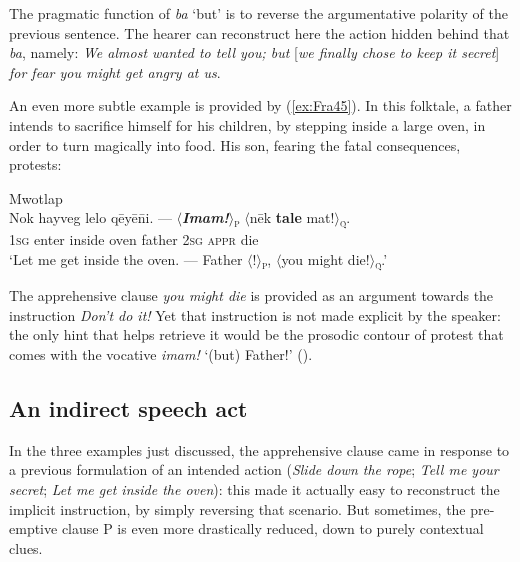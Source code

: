 \documentclass[output=paper,colorlinks,citecolor=brown]{langscibook}
\begin{document}
\noindent The pragmatic function of \textit{ba} `but' is to reverse the argumentative polarity of the previous sentence. The hearer can reconstruct here the action hidden behind that \textit{ba}, namely: \textit{We almost wanted to tell you; but} [\textit{we finally chose to keep it secret}] \textit{for fear you might get angry at us}. 

An even more subtle example is provided by (\ref{ex:Fra45}). In this folktale, a father intends to sacrifice himself for his children, by stepping inside a large oven, in order to turn magically into food. His son, fearing the fatal consequences, protests:

\ea \label{ex:Fra45} \textnormal{Mwotlap}  \\
\gll Nok hayveg lelo qēyē\={n}i. --- ${\langle}$\textbf{\textit{Imam!}}${\rangle}$\textnormal{\textsc{\textsubscript{p}}}  ${\langle}$nēk \textbf{tale} mat!${\rangle}$\textnormal{\textsc{\textsubscript{q}}}. \\
\textsc{1sg} enter inside oven {} father \textsc{2sg} \textsc{appr} die \\
\glt `Let me get inside the oven. --- Father ${\langle}$!${\rangle}$\textsc{\textsubscript{p}}, ${\langle}$you might die!${\rangle}$\textsc{\textsubscript{q}}.' \\
\z


\noindent The apprehensive clause \textit{you might die} is provided as an argument towards the instruction \textit{Don't do it!} Yet that instruction is not made explicit by the speaker: the only hint that helps retrieve it would be the prosodic contour of protest that comes with the vocative \textit{imam!} `(but) Father!' (\cite[311]{francois2003}).
 




\subsection{An indirect speech act}
\label{subsec:indirect}
\largerpage

 
In the three examples just discussed, the apprehensive clause came in response to a previous formulation of an intended action (\textit{Slide down the rope}; \textit{Tell me your secret}; \textit{Let me get inside the oven}): this made it actually easy to reconstruct the implicit instruction, by simply reversing that scenario. But sometimes, the pre-emptive clause P is even more drastically reduced, down to purely contextual clues.
\end{document}
